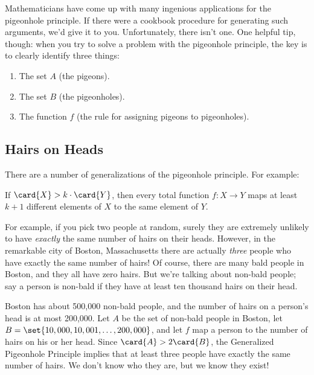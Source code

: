 Mathematicians have come up with many ingenious applications for the
pigeonhole principle.  If there were a cookbook procedure for
generating such arguments, we'd give it to you.  Unfortunately, there
isn't one.  One helpful tip, though: when you try to solve a problem
with the pigeonhole principle, the key is to clearly identify three
things:

\begin{enumerate}

\item The set $A$ (the pigeons).

\item The set $B$ (the pigeonholes).

\item The function $f$ (the rule for assigning pigeons to pigeonholes).

\end{enumerate}

\subsection{Hairs on Heads}

There are a number of generalizations of the pigeonhole principle.
For example:

\begin{mathrule}
  If $\card{X} > k \cdot \card{Y}$, then every total function $f : X \to
  Y$ maps at least $k+1$ different elements of $X$ to the same element of
  $Y$.
\end{mathrule}

For example, if you pick two people at random, surely they are extremely
unlikely to have \emph{exactly} the same number of hairs on their heads.
However, in the remarkable city of Boston, Massachusetts there are
actually \emph{three} people who have exactly the same number of hairs!
Of course, there are many bald people in Boston, and they all have zero
hairs.  But we're talking about non-bald people; say a person is non-bald
if they have at least ten thousand hairs on their head.

Boston has about 500,000 non-bald people, and the number of hairs on a
person's head is at most 200,000.  Let $A$ be the set of non-bald people
in Boston, let $B = \set{10,000, 10,001, \dots, 200,000}$, and let $f$ map
a person to the number of hairs on his or her head.  Since $\card{A} > 2
\card{B}$, the Generalized Pigeonhole Principle implies that at least
three people have exactly the same number of hairs.  We don't know who
they are, but we know they exist!

